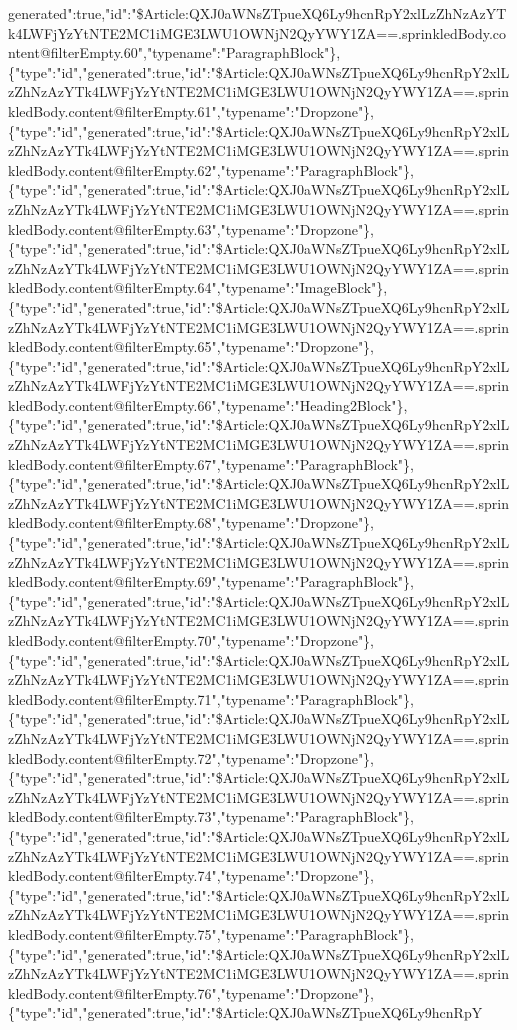 generated":true,"id":"\$Article:QXJ0aWNsZTpueXQ6Ly9hcnRpY2xlLzZhNzAzYTk4LWFjYzYtNTE2MC1iMGE3LWU1OWNjN2QyYWY1ZA==.sprinkledBody.content@filterEmpty.60","typename":"ParagraphBlock"\},\{"type":"id","generated":true,"id":"\$Article:QXJ0aWNsZTpueXQ6Ly9hcnRpY2xlLzZhNzAzYTk4LWFjYzYtNTE2MC1iMGE3LWU1OWNjN2QyYWY1ZA==.sprinkledBody.content@filterEmpty.61","typename":"Dropzone"\},\{"type":"id","generated":true,"id":"\$Article:QXJ0aWNsZTpueXQ6Ly9hcnRpY2xlLzZhNzAzYTk4LWFjYzYtNTE2MC1iMGE3LWU1OWNjN2QyYWY1ZA==.sprinkledBody.content@filterEmpty.62","typename":"ParagraphBlock"\},\{"type":"id","generated":true,"id":"\$Article:QXJ0aWNsZTpueXQ6Ly9hcnRpY2xlLzZhNzAzYTk4LWFjYzYtNTE2MC1iMGE3LWU1OWNjN2QyYWY1ZA==.sprinkledBody.content@filterEmpty.63","typename":"Dropzone"\},\{"type":"id","generated":true,"id":"\$Article:QXJ0aWNsZTpueXQ6Ly9hcnRpY2xlLzZhNzAzYTk4LWFjYzYtNTE2MC1iMGE3LWU1OWNjN2QyYWY1ZA==.sprinkledBody.content@filterEmpty.64","typename":"ImageBlock"\},\{"type":"id","generated":true,"id":"\$Article:QXJ0aWNsZTpueXQ6Ly9hcnRpY2xlLzZhNzAzYTk4LWFjYzYtNTE2MC1iMGE3LWU1OWNjN2QyYWY1ZA==.sprinkledBody.content@filterEmpty.65","typename":"Dropzone"\},\{"type":"id","generated":true,"id":"\$Article:QXJ0aWNsZTpueXQ6Ly9hcnRpY2xlLzZhNzAzYTk4LWFjYzYtNTE2MC1iMGE3LWU1OWNjN2QyYWY1ZA==.sprinkledBody.content@filterEmpty.66","typename":"Heading2Block"\},\{"type":"id","generated":true,"id":"\$Article:QXJ0aWNsZTpueXQ6Ly9hcnRpY2xlLzZhNzAzYTk4LWFjYzYtNTE2MC1iMGE3LWU1OWNjN2QyYWY1ZA==.sprinkledBody.content@filterEmpty.67","typename":"ParagraphBlock"\},\{"type":"id","generated":true,"id":"\$Article:QXJ0aWNsZTpueXQ6Ly9hcnRpY2xlLzZhNzAzYTk4LWFjYzYtNTE2MC1iMGE3LWU1OWNjN2QyYWY1ZA==.sprinkledBody.content@filterEmpty.68","typename":"Dropzone"\},\{"type":"id","generated":true,"id":"\$Article:QXJ0aWNsZTpueXQ6Ly9hcnRpY2xlLzZhNzAzYTk4LWFjYzYtNTE2MC1iMGE3LWU1OWNjN2QyYWY1ZA==.sprinkledBody.content@filterEmpty.69","typename":"ParagraphBlock"\},\{"type":"id","generated":true,"id":"\$Article:QXJ0aWNsZTpueXQ6Ly9hcnRpY2xlLzZhNzAzYTk4LWFjYzYtNTE2MC1iMGE3LWU1OWNjN2QyYWY1ZA==.sprinkledBody.content@filterEmpty.70","typename":"Dropzone"\},\{"type":"id","generated":true,"id":"\$Article:QXJ0aWNsZTpueXQ6Ly9hcnRpY2xlLzZhNzAzYTk4LWFjYzYtNTE2MC1iMGE3LWU1OWNjN2QyYWY1ZA==.sprinkledBody.content@filterEmpty.71","typename":"ParagraphBlock"\},\{"type":"id","generated":true,"id":"\$Article:QXJ0aWNsZTpueXQ6Ly9hcnRpY2xlLzZhNzAzYTk4LWFjYzYtNTE2MC1iMGE3LWU1OWNjN2QyYWY1ZA==.sprinkledBody.content@filterEmpty.72","typename":"Dropzone"\},\{"type":"id","generated":true,"id":"\$Article:QXJ0aWNsZTpueXQ6Ly9hcnRpY2xlLzZhNzAzYTk4LWFjYzYtNTE2MC1iMGE3LWU1OWNjN2QyYWY1ZA==.sprinkledBody.content@filterEmpty.73","typename":"ParagraphBlock"\},\{"type":"id","generated":true,"id":"\$Article:QXJ0aWNsZTpueXQ6Ly9hcnRpY2xlLzZhNzAzYTk4LWFjYzYtNTE2MC1iMGE3LWU1OWNjN2QyYWY1ZA==.sprinkledBody.content@filterEmpty.74","typename":"Dropzone"\},\{"type":"id","generated":true,"id":"\$Article:QXJ0aWNsZTpueXQ6Ly9hcnRpY2xlLzZhNzAzYTk4LWFjYzYtNTE2MC1iMGE3LWU1OWNjN2QyYWY1ZA==.sprinkledBody.content@filterEmpty.75","typename":"ParagraphBlock"\},\{"type":"id","generated":true,"id":"\$Article:QXJ0aWNsZTpueXQ6Ly9hcnRpY2xlLzZhNzAzYTk4LWFjYzYtNTE2MC1iMGE3LWU1OWNjN2QyYWY1ZA==.sprinkledBody.content@filterEmpty.76","typename":"Dropzone"\},\{"type":"id","generated":true,"id":"\$Article:QXJ0aWNsZTpueXQ6Ly9hcnRpY